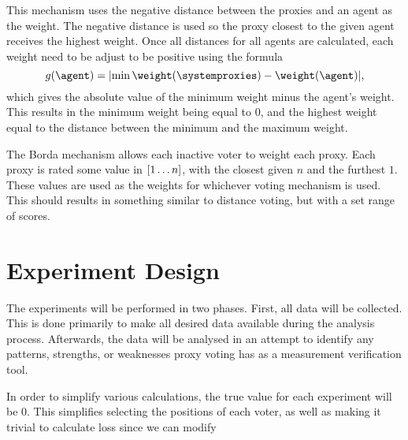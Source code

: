 This mechanism uses the negative distance between the proxies and an agent as
the weight.
The negative distance is used so the proxy closest to the given agent
receives the highest weight.
Once all distances for all agents are calculated, each weight need to be
adjust to be positive using the formula
\begin{equation}
    g{(\agent)} = \lvert
        \min{\weightof{\systemproxies}} - \weightof{\agent}
    \rvert
    \text{,}\label{eq:distance-voting-adjustment}
\end{equation}
which gives the absolute value of the minimum weight minus the agent's weight.
This results in the minimum weight being equal to 0, and the highest weight
equal to the distance between the minimum and the maximum weight.

\label{para:borda}
The Borda mechanism allows each inactive voter to weight each proxy.
Each proxy is rated some value in $[1 \mathellipsis n]$, with the closest
given $n$ and the furthest $1$.
These values are used as the weights for whichever voting mechanism is used.
This should results in something similar to distance voting, but with
a set range of scores.

\section{Experiment Design}\label{sec:experiment-design}
%
%

The experiments will be performed in two phases.
First, all data will be collected.
This is done primarily to make all desired data available during the analysis
process.
Afterwards, the data will be analysed in an attempt to identify any patterns,
strengths, or weaknesses proxy voting has as a measurement verification tool.

In order to simplify various calculations, the true value for each experiment
will be 0.
This simplifies selecting the positions of each voter, as well as making it
trivial to calculate loss since we can modify


